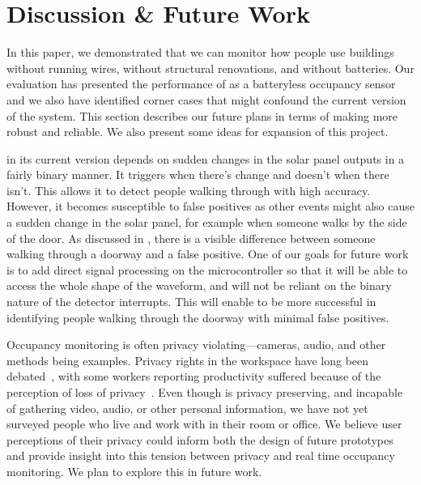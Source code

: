 \section{Discussion \& Future Work}
\label{sec:discussion}

In this paper, we demonstrated that we can monitor how people use buildings without running wires, without structural renovations, and without batteries.
Our evaluation has presented the performance of \sysname as a batteryless occupancy sensor and we also have identified corner cases that might confound the current version of the system.
This section describes our future plans in terms of making \sysname more robust and reliable.
We also present some ideas for expansion of this project.

 \sysname in its current version depends on sudden changes in the solar panel outputs in a fairly binary manner.
It triggers when there's change and doesn't when there isn't.
This allows it to detect people walking through with high accuracy.
However, it becomes susceptible to false positives as other events might also cause a sudden change in the solar panel, for example when someone walks by the side of the door.
As discussed in , there is a visible difference between someone walking through a doorway and a false positive.
One of our goals for future work is to add direct signal processing on the microcontroller so that it will be able to access the whole shape of the waveform, and will not be reliant on the binary nature of the detector interrupts.
This will enable \sysname to be more successful in identifying people walking through the doorway with minimal false positives.

Occupancy monitoring is often privacy violating---cameras, audio, and other methods being examples.
Privacy rights in the workspace have long been debated~\cite{oz1999electronic}, with some workers reporting productivity suffered because of the perception of loss of privacy~\cite{stanton2000electronic}.
Even though \sysname is privacy preserving, and incapable of gathering video, audio, or other personal information, we have not yet surveyed people who live and work with \sysname in their room or office.
We believe user perceptions of their privacy could inform both the design of future \sysname prototypes and provide insight into this tension between privacy and real time occupancy monitoring.
We plan to explore this in future work.


